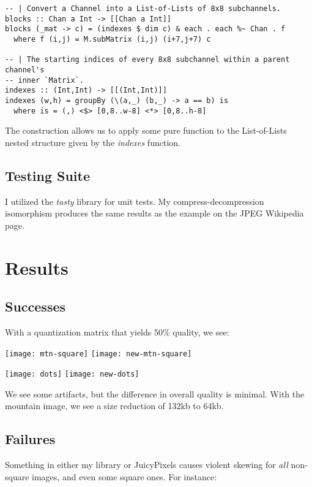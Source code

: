 \documentclass{article}
\begin{document}
\begin{lstlisting}
-- | Convert a Channel into a List-of-Lists of 8x8 subchannels.
blocks :: Chan a Int -> [[Chan a Int]]
blocks (_mat -> c) = (indexes $ dim c) & each . each %~ Chan . f
  where f (i,j) = M.subMatrix (i,j) (i+7,j+7) c

-- | The starting indices of every 8x8 subchannel within a parent channel's
-- inner `Matrix`.
indexes :: (Int,Int) -> [[(Int,Int)]]
indexes (w,h) = groupBy (\(a,_) (b,_) -> a == b) is
  where is = (,) <$> [0,8..w-8] <*> [0,8..h-8]  
\end{lstlisting}

The  construction allows us
to apply some pure function to the List-of-Lists nested structure
given by the \emph{indexes} function.

\subsection{Testing Suite}
I utilized the \emph{tasty} library for unit tests.
My compress-decompression isomorphism produces the same results
as the example on the JPEG Wikipedia page.

\section{Results}
\subsection{Successes}
With a quantization matrix that yields 50\% quality, we see:

\begin{center}
  \texttt{[image: mtn-square]}
  \texttt{[image: new-mtn-square]}
\end{center}

\begin{center}
  \texttt{[image: dots]}
  \texttt{[image: new-dots]}
\end{center}

We see some artifacts, but the difference in overall quality is minimal.
With the mountain image, we see a size reduction of 132kb to 64kb.

\subsection{Failures}
Something in either my library or JuicyPixels causes violent skewing for
\emph{all} non-square images, and even some square ones. For instance:
\end{document}
